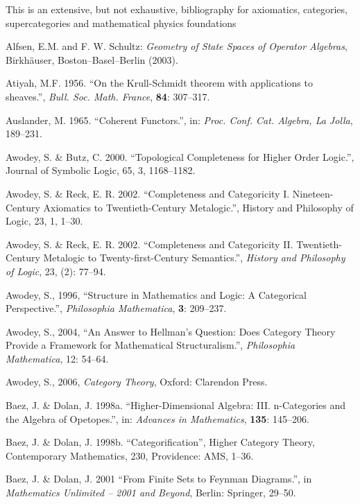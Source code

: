 \documentclass[12pt]{article}
\theoremstyle{plain}
\theoremstyle{definition}
\numberwithin{equation}{section}
\begin{document}
This is an extensive, but not exhaustive, bibliography for axiomatics, categories, supercategories and mathematical physics foundations 


\begin{thebibliography}{99}

Alfsen, E.M. and F. W. Schultz: \emph{Geometry of State Spaces of
Operator Algebras}, Birkh\"auser, Boston--Basel--Berlin (2003).

Atiyah, M.F. 1956. ``On the Krull-Schmidt theorem with applications to sheaves.'',
\emph{Bull. Soc. Math. France}, \textbf{84}: 307--317.

Auslander, M. 1965. ``Coherent Functors.'', in: \emph{Proc. Conf. Cat. Algebra, La Jolla},
189--231.
  
Awodey, S. \& Butz, C. 2000. ``Topological Completeness for Higher Order Logic.'', Journal of Symbolic Logic, 65, 3, 1168--1182. 

Awodey, S. \& Reck, E. R. 2002. ``Completeness and Categoricity I. 
Nineteen-Century Axiomatics to Twentieth-Century Metalogic.'', History and Philosophy of Logic, 23, 1, 1--30.
  
Awodey, S. \& Reck, E. R. 2002. ``Completeness and Categoricity II. Twentieth-Century Metalogic to Twenty-first-Century Semantics.'', \emph{History and Philosophy of Logic}, 23, (2): 77--94.  

Awodey, S., 1996, ``Structure in Mathematics and Logic: A Categorical Perspective.'', 
\emph{Philosophia Mathematica}, {\bf 3}: 209--237. 

Awodey, S., 2004, ``An Answer to Hellman's Question: Does Category Theory Provide a Framework for Mathematical Structuralism.'', \emph{Philosophia Mathematica}, 12: 54--64. 

Awodey, S., 2006, {\em Category Theory}, Oxford: Clarendon Press. 

Baez, J. \& Dolan, J. 1998a. ``Higher-Dimensional Algebra: III. n-Categories and the Algebra of Opetopes.'', 
in: \emph{Advances in Mathematics}, {\bf 135}: 145--206.  

Baez, J. \& Dolan, J. 1998b. ``Categorification'', Higher Category Theory, Contemporary Mathematics, 230, Providence: AMS, 1--36. 

Baez, J. \& Dolan, J. 2001 ``From Finite Sets to Feynman Diagrams.'', 
in \emph{Mathematics Unlimited -- 2001 and Beyond}, Berlin: Springer, 29--50.  


\end{thebibliography}
\end{document}
